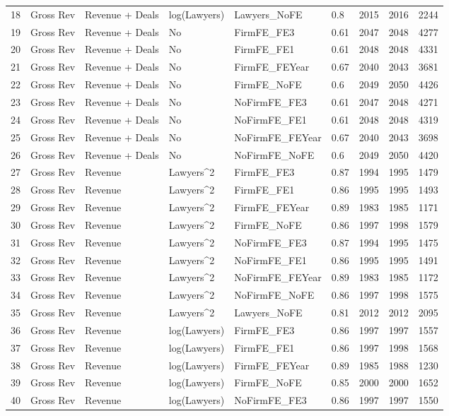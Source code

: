 \documentclass{article}
\begin{document}
\begin{table}[H]
\begin{tabular}{rllllllll}
  18 & Gross Rev & Revenue + Deals & log(Lawyers) & Lawyers\_NoFE & 0.8 & 2015 & 2016 & 2244 \\ 
  19 & Gross Rev & Revenue + Deals & No & FirmFE\_FE3 & 0.61 & 2047 & 2048 & 4277 \\ 
  20 & Gross Rev & Revenue + Deals & No & FirmFE\_FE1 & 0.61 & 2048 & 2048 & 4331 \\ 
  21 & Gross Rev & Revenue + Deals & No & FirmFE\_FEYear & 0.67 & 2040 & 2043 & 3681 \\ 
  22 & Gross Rev & Revenue + Deals & No & FirmFE\_NoFE & 0.6 & 2049 & 2050 & 4426 \\ 
  23 & Gross Rev & Revenue + Deals & No & NoFirmFE\_FE3 & 0.61 & 2047 & 2048 & 4271 \\ 
  24 & Gross Rev & Revenue + Deals & No & NoFirmFE\_FE1 & 0.61 & 2048 & 2048 & 4319 \\ 
  25 & Gross Rev & Revenue + Deals & No & NoFirmFE\_FEYear & 0.67 & 2040 & 2043 & 3698 \\ 
  26 & Gross Rev & Revenue + Deals & No & NoFirmFE\_NoFE & 0.6 & 2049 & 2050 & 4420 \\ 
  27 & Gross Rev & Revenue & Lawyers^2 & FirmFE\_FE3 & 0.87 & 1994 & 1995 & 1479 \\ 
  28 & Gross Rev & Revenue & Lawyers^2 & FirmFE\_FE1 & 0.86 & 1995 & 1995 & 1493 \\ 
  29 & Gross Rev & Revenue & Lawyers^2 & FirmFE\_FEYear & 0.89 & 1983 & 1985 & 1171 \\ 
  30 & Gross Rev & Revenue & Lawyers^2 & FirmFE\_NoFE & 0.86 & 1997 & 1998 & 1579 \\ 
  31 & Gross Rev & Revenue & Lawyers^2 & NoFirmFE\_FE3 & 0.87 & 1994 & 1995 & 1475 \\ 
  32 & Gross Rev & Revenue & Lawyers^2 & NoFirmFE\_FE1 & 0.86 & 1995 & 1995 & 1491 \\ 
  33 & Gross Rev & Revenue & Lawyers^2 & NoFirmFE\_FEYear & 0.89 & 1983 & 1985 & 1172 \\ 
  34 & Gross Rev & Revenue & Lawyers^2 & NoFirmFE\_NoFE & 0.86 & 1997 & 1998 & 1575 \\ 
  35 & Gross Rev & Revenue & Lawyers^2 & Lawyers\_NoFE & 0.81 & 2012 & 2012 & 2095 \\ 
  36 & Gross Rev & Revenue & log(Lawyers) & FirmFE\_FE3 & 0.86 & 1997 & 1997 & 1557 \\ 
  37 & Gross Rev & Revenue & log(Lawyers) & FirmFE\_FE1 & 0.86 & 1997 & 1998 & 1568 \\ 
  38 & Gross Rev & Revenue & log(Lawyers) & FirmFE\_FEYear & 0.89 & 1985 & 1988 & 1230 \\ 
  39 & Gross Rev & Revenue & log(Lawyers) & FirmFE\_NoFE & 0.85 & 2000 & 2000 & 1652 \\ 
  40 & Gross Rev & Revenue & log(Lawyers) & NoFirmFE\_FE3 & 0.86 & 1997 & 1997 & 1550 \\ 
   \hline
\end{tabular}
\end{table}
\end{document}
